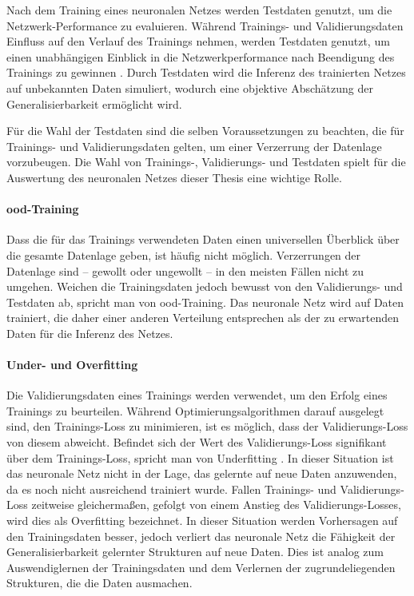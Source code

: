 Nach dem Training eines neuronalen Netzes werden Testdaten genutzt, um die Netzwerk-Performance zu evaluieren. Während Trainings- und Validierungsdaten Einfluss auf den Verlauf des Trainings nehmen, werden Testdaten genutzt, um einen unabhängigen Einblick in die Netzwerkperformance nach Beendigung des Trainings zu gewinnen \cite{nn_terminology}. Durch Testdaten wird die Inferenz des trainierten Netzes auf unbekannten Daten simuliert, wodurch eine objektive Abschätzung der Generalisierbarkeit ermöglicht wird.

Für die Wahl der Testdaten sind die selben Voraussetzungen zu beachten, die für Trainings- und Validierungsdaten gelten, um einer Verzerrung der Datenlage vorzubeugen. Die Wahl von Trainings-, Validierungs- und Testdaten spielt für die Auswertung des neuronalen Netzes dieser Thesis eine wichtige Rolle.

\paragraph{\Acl{ood}-Training}

Dass die für das Trainings verwendeten Daten einen universellen Überblick über die gesamte Datenlage geben, ist häufig nicht möglich. Verzerrungen der Datenlage sind -- gewollt oder ungewollt -- in den meisten Fällen nicht zu umgehen. Weichen die Trainingsdaten jedoch bewusst von den Validierungs- und Testdaten ab, spricht man von \Acf{ood}-Training. Das neuronale Netz wird auf Daten trainiert, die daher einer anderen Verteilung entsprechen als der zu erwartenden Daten für die Inferenz des Netzes.

\paragraph{Under- und Overfitting}

Die Validierungsdaten eines Trainings werden verwendet, um den Erfolg eines Trainings zu beurteilen. Während Optimierungsalgorithmen darauf ausgelegt sind, den Trainings-Loss zu minimieren, ist es möglich, dass der Validierungs-Loss von diesem abweicht. Befindet sich der Wert des Validierungs-Loss signifikant über dem Trainings-Loss, spricht man von Underfitting \cite{nn_terminology}. In dieser Situation ist das neuronale Netz nicht in der Lage, das gelernte auf neue Daten anzuwenden, da es noch nicht ausreichend trainiert wurde. Fallen Trainings- und Validierungs-Loss zeitweise gleichermaßen, gefolgt von einem Anstieg des Validierungs-Losses, wird dies als Overfitting bezeichnet. In dieser Situation werden Vorhersagen auf den Trainingsdaten besser, jedoch verliert das neuronale Netz die Fähigkeit der Generalisierbarkeit gelernter Strukturen auf neue Daten. Dies ist analog zum Auswendiglernen der Trainingsdaten und dem Verlernen der zugrundeliegenden Strukturen, die die Daten ausmachen.

